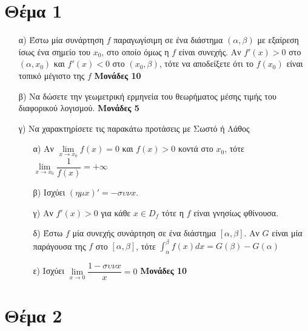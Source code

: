 \documentclass[12pt]{extarticle}
\begin{document}
\section*{Θέμα 1}
\noindent
\begin{enumerate}
  \item[α)] Έστω μία συνάρτηση $f$ παραγωγίσιμη σε ένα διάστημα $(α,β)$ με εξαίρεση ίσως ένα σημείο του $x_0$, στο οποίο όμως η $f$ είναι συνεχής. Αν $f'(x)>0$ στο $(α,x_0)$ και $f'(x)<0$ στο $(x_0,β)$, τότε να αποδείξετε ότι το $f(x_0)$ είναι τοπικό μέγιστο της $f$ \hspace*{\fill} \textbf{Μονάδες 10}
  \item[β)] Να δώσετε την γεωμετρική ερμηνεία του θεωρήματος μέσης τιμής του διαφορικού λογισμού. \hspace*{\fill} \textbf{Μονάδες 5}
  \item[γ)] Να χαρακτηρίσετε τις παρακάτω προτάσεις με Σωστό ή Λάθος
    \begin{enumerate}
      \item [α)] Αν $\lim\limits_{x \to x_0}{ f(x) }=0$ και $f(x)>0$ κοντά στο $x_0$, τότε $\lim\limits_{x \to x_0}{ \dfrac{1}{f(x)} }=+\infty$
      \item [β)] Ισχύει $\left( ημx \right)'=-συνx$.
      \item [γ)] Αν $f'(x)>0$ για κάθε $x \in D_f$ τότε η $f$ είναι γνησίως φθίνουσα.
      \item [δ)] Έστω $f$ μία συνεχής συνάρτηση σε ένα διάστημα $[α,β]$. Αν $G$ είναι μία παράγουσα της $f$ στο $[α,β]$, τότε $\int_α^β f(x)dx=G(β)-G(α)$
      \item [ε)] Ισχύει $\lim\limits_{x \to 0}{ \dfrac{1-συνx}{x} }=0$ \hspace*{\fill} \textbf{Μονάδες 10}
    \end{enumerate}

\end{enumerate}

\section*{Θέμα 2}
\noindent
\end{document}
